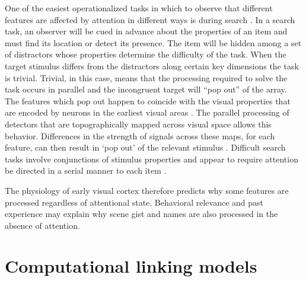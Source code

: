One of the easiest operationalized tasks in which to observe that different features are affected by attention in different ways is during search \citep{Wolfe1994-ew}. In a search task, an observer will be cued in advance about the properties of an item and must find its location or detect its presence. The item will be hidden among a set of distractors whose properties determine the difficulty of the task. When the target stimulus differs from the distractors along certain key dimensions the task is trivial. Trivial, in this case, means that the processing required to solve the task occurs in parallel and the incongruent target will ``pop out'' of the array. The features which pop out happen to coincide with the visual properties that are encoded by neurons in the earliest visual areas \citep{Barlow1957-by,Hubel1962-pn,Hubel1959-fo}. The parallel processing of detectors that are topographically mapped across visual space allows this behavior. Differences in the strength of signals across these maps, for each feature, can then result in ‘pop out’ of the relevant stimulus \citep{Nothdurft1993-xt,Treisman1985-dr}. Difficult search tasks involve conjunctions of stimulus properties \citep{Egeth1984-ch} and appear to require attention be directed in a serial manner to each item \citep{Treisman1980-gu}.

The physiology of early visual cortex therefore predicts why some features are processed regardless of attentional state. Behavioral relevance and past experience may explain why scene gist \citep{Li2002-ji,Peelen2009-us} and names \citep{Moray1959-fn} are also processed in the absence of attention. 

\section{Computational linking models}

